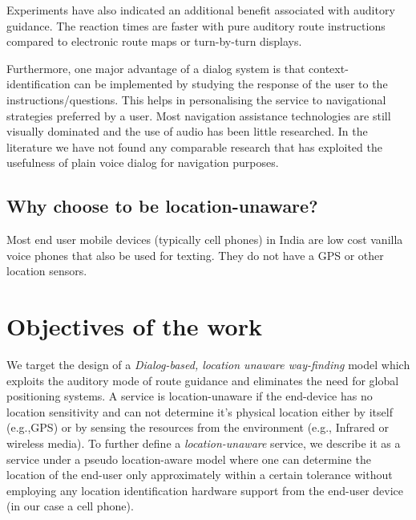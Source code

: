 \documentclass{iitkthesis}
\begin{document}
Experiments \cite{srinivasaneffect} have also indicated an additional 
benefit associated with auditory guidance. The reaction times are 
faster with pure auditory route instructions compared to electronic 
route maps or turn-by-turn displays. 

Furthermore,  one major advantage of a dialog system 
is that context-identification can be implemented by studying the 
response of the user to the instructions/questions. This helps in 
personalising the service to navigational 
strategies preferred by a user. Most navigation assistance 
technologies are still visually dominated and the use of audio has been 
little researched. In the literature we have not found any comparable research 
that has exploited the usefulness of plain voice dialog for 
navigation purposes.
\subsection{Why choose to be location-unaware?}
Most end user mobile devices (typically cell phones)  in India are low cost 
vanilla voice phones that also be used for texting. They do not have a GPS or
other location sensors.


 \section{Objectives of the work}
We target the design of a \textit{Dialog-based, location unaware way-finding
} model which exploits the auditory mode of route guidance and eliminates 
the need for global positioning systems. A service is location-unaware if 
the end-device has no location sensitivity and can not determine it's 
physical location either by itself (e.g.,GPS) or by sensing the resources 
from the environment (e.g., Infrared or wireless media). To further 
define a \textit{location-unaware} service, we describe it as a service 
under a pseudo location-aware model where one can determine the 
location of the end-user only approximately within a certain tolerance
without employing any location identification hardware support from the 
end-user device (in our case a cell phone). 
\end{document}
